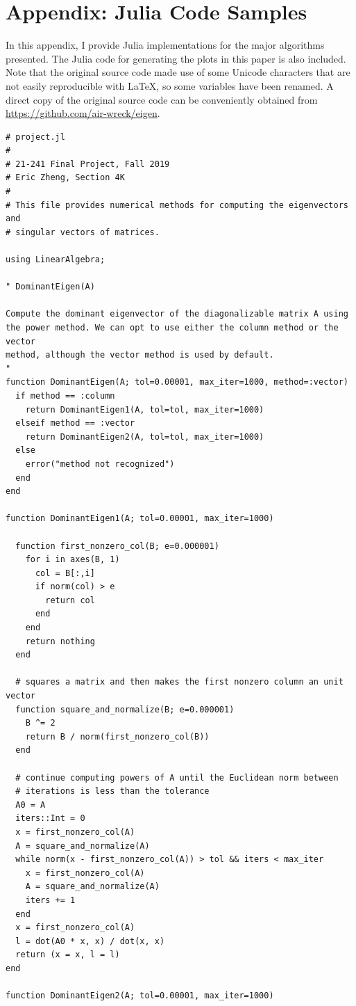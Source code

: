 \documentclass{article}
\begin{document}
\section{Appendix: Julia Code Samples}
In this appendix, I provide Julia implementations for the major algorithms presented. The Julia code for generating the plots in this paper is also included. Note that the original source code made use of some Unicode characters that are not easily reproducible with \LaTeX, so some variables have been renamed. A direct copy of the original source code can be conveniently obtained from \url{https://github.com/air-wreck/eigen}.

\begin{lstlisting}
# project.jl
#
# 21-241 Final Project, Fall 2019
# Eric Zheng, Section 4K
#
# This file provides numerical methods for computing the eigenvectors and
# singular vectors of matrices.

using LinearAlgebra;

" DominantEigen(A)

Compute the dominant eigenvector of the diagonalizable matrix A using
the power method. We can opt to use either the column method or the vector
method, although the vector method is used by default.
"
function DominantEigen(A; tol=0.00001, max_iter=1000, method=:vector)
  if method == :column
    return DominantEigen1(A, tol=tol, max_iter=1000)
  elseif method == :vector
    return DominantEigen2(A, tol=tol, max_iter=1000)
  else
    error("method not recognized")
  end
end

function DominantEigen1(A; tol=0.00001, max_iter=1000)

  function first_nonzero_col(B; e=0.000001)
    for i in axes(B, 1)
      col = B[:,i]
      if norm(col) > e
        return col
      end
    end
    return nothing
  end

  # squares a matrix and then makes the first nonzero column an unit vector
  function square_and_normalize(B; e=0.000001)
    B ^= 2
    return B / norm(first_nonzero_col(B))
  end

  # continue computing powers of A until the Euclidean norm between
  # iterations is less than the tolerance
  A0 = A
  iters::Int = 0
  x = first_nonzero_col(A)
  A = square_and_normalize(A)
  while norm(x - first_nonzero_col(A)) > tol && iters < max_iter
    x = first_nonzero_col(A)
    A = square_and_normalize(A)
    iters += 1
  end
  x = first_nonzero_col(A)
  l = dot(A0 * x, x) / dot(x, x)
  return (x = x, l = l)
end

function DominantEigen2(A; tol=0.00001, max_iter=1000)


\end{lstlisting}
\end{document}
